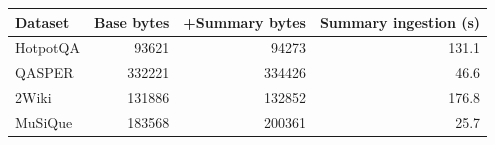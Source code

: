 \begin{tabular}{lrrr}
\toprule
Dataset & Base bytes & +Summary bytes & Summary ingestion (s) \\
\midrule
HotpotQA & 93621 & 94273 & 131.1 \\
QASPER & 332221 & 334426 & 46.6 \\
2Wiki & 131886 & 132852 & 176.8 \\
MuSiQue & 183568 & 200361 & 25.7 \\
\bottomrule
\end{tabular}
